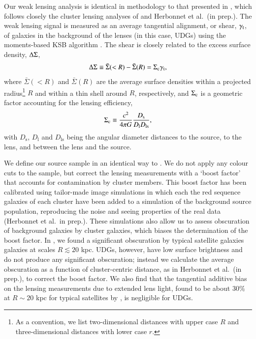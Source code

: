 \documentclass[usenatbib,fleqn]{mnras}
\begin{document}
Our weak lensing analysis is identical in methodology to that presented in \cite{sifon17}, which follows closely the cluster lensing analyses of \cite{hoekstra15} and Herbonnet et al.\ (in prep.). The weak lensing signal is measured as an average tangential alignment, or shear, $\gamma_\mathrm{t}$, of galaxies in the background of the lenses (in this case, UDGs) using the moments-based KSB algorithm \citep{kaiser95,luppino97,hoekstra98}. The shear is closely related to the excess surface density, $\Delta\Sigma$, 
\begin{equation}
 \Delta\Sigma \equiv \bar\Sigma(<R) - \bar\Sigma(R) = \Sigma_\mathrm{c}\gamma_\mathrm{t},
\end{equation}
where $\bar\Sigma(<R)$ and $\bar\Sigma(R)$ are the average surface densities within a projected radius\footnote{As a convention, we list two-dimensional distances with upper case $R$ and three-dimensional distances with lower case $r$.} $R$ and within a thin shell around $R$, respectively, and $\Sigma_\mathrm{c}$ is a geometric factor accounting for the lensing efficiency,
\begin{equation}
 \Sigma_\mathrm{c} \equiv \frac{c^2}{4\pi G} \frac{D_\mathrm{s}}{D_\mathrm{l}D_\mathrm{ls}},
\end{equation}
with $D_\mathrm{s}$, $D_\mathrm{l}$ and $D_\mathrm{ls}$ being the angular diameter distances to the source, to the lens, and between the lens and the source.

We define our source sample in an identical way to \cite{sifon17}. We do not apply any colour cuts to the sample, but correct the lensing measurements with a `boost factor' that accounts for contamination by cluster members. This boost factor has been calibrated using tailor-made image simulations in which each the red sequence galaxies of each cluster have been added to a simulation of the background source population, reproducing the noise and seeing properties of the real data (Herbonnet et al.\ in prep.). These simulations also allow us to assess obscuration of background galaxies by cluster galaxies, which biases the determination of the boost factor. In \cite{sifon17}, we found a significant obscuration by typical satellite galaxies galaxies at scales $R\lesssim20$ kpc. UDGs, however, have low surface brightness and do not produce any significant obscuration; instead we calculate the average obscuration as a function of cluster-centric distance, as in Herbonnet et al.\ (in prep.), to correct the boost factor. We also find that the tangential additive bias on the lensing measurements due to extended lens light, found to be about 30\% at $R\sim20$ kpc for typical satellites by \citep{sifon17}, is negligible for UDGs.
\end{document}
